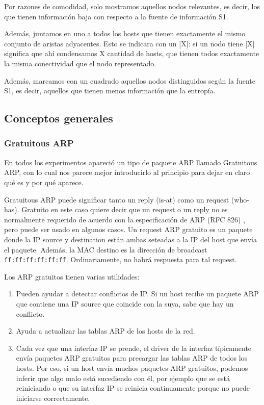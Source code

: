 Por razones de comodidad, solo mostramos aquellos nodos relevantes, es decir, los que tienen información baja con respecto a la fuente de información S1.

Además, juntamos en uno a todos los hosts que tienen exactamente el mismo conjunto de aristas adyacentes. Esto se indicara con un [X]: si un nodo tiene [X] significa que ahí condensamos X cantidad de hosts, que tienen todos exactamente la misma conectividad que el nodo representado. 

Además, marcamos con un cuadrado aquellos nodos distinguidos según la fuente S1, es decir, aquellos que tienen menos información que la entropía.


\subsection{Conceptos generales}

\subsubsection{Gratuitous ARP}

En todos los experimentos apareció un tipo de paquete ARP llamado Gratuitous ARP, con lo cual nos parece mejor introducirlo al principio para dejar en claro qu\'e es y por qu\'e aparece.

Gratuitous ARP puede significar tanto un reply (is-at) como un request (who-has). Gratuito en este caso quiere decir que un request o un reply no es normalmente requerido de acuerdo con la especificación de ARP (RFC 826) \cite{arp}, pero puede ser usado en algunos casos.
Un request ARP gratuito es un paquete donde la IP source y destination están ambas seteadas a la IP del host que envía el paquete. Además, la MAC destino es la dirección de broadcast \texttt{ff:ff:ff:ff:ff:ff}. Ordinariamente, no habrá respuesta para tal request.

Los ARP gratuitos tienen varias utilidades:

\begin{enumerate}
  \item Pueden ayudar a detectar conflictos de IP. Si un host recibe un paquete ARP que contiene una IP source que coincide con la suya, sabe que hay un conflicto.
  \item Ayuda a actualizar las tablas ARP de los hosts de la red.
  \item Cada vez que una interfaz IP se prende, el driver de la interfaz típicamente envía paquetes ARP gratuitos para precargar las tablas ARP de todos los hosts. Por eso, si un host envía muchos paquetes ARP gratuitos, podemos inferir que algo malo está sucediendo con \'el, por ejemplo que se está reiniciando o que su interfaz IP se reinicia continuamente porque no puede iniciarse correctamente.
\end{enumerate}


